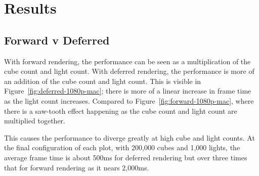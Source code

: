 \documentclass[11pt]{article}
\begin{document}
\section{Results}

\subsection{Forward v Deferred}
With forward rendering, the performance can be seen as a multiplication of the cube count and light count.
With deferred rendering, the performance is more of an addition of the cube count and light count.
This is visible in Figure~\ref{fig:deferred-1080p-mac}; there is more of a linear increase in frame time as the light count increases.
Compared to Figure~\ref{fig:forward-1080p-mac}, where there is a saw-tooth effect happening as the cube count and light count are multiplied together.

This causes the performance to diverge greatly at high cube and light counts.
At the final configuration of each plot, with 200,000 cubes and 1,000 lights, the average frame time is about 500ms for deferred rendering but over three times that for forward rendering as it nears 2,000ms.
\end{document}
